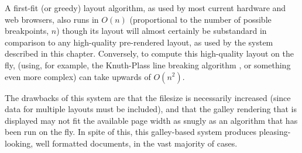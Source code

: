 A first-fit (or greedy) layout algorithm, as used by most current \ebook{} hardware and web browsers, also runs in $O(n)$ (proportional to the number of possible breakpoints, $n$) though its layout will almost certainly be substandard in comparison to any high-quality pre-rendered layout, as used by the system described in this chapter. Conversely, to compute this high-quality layout on the fly, (using, for example, the Knuth-Plass line breaking algorithm \cite{Knuth1981}, or something even more complex) can take upwards of $O(n^2)$.

The drawbacks of this system are that the filesize is necessarily increased (since data for multiple layouts must be included), and that the galley rendering that is displayed may not fit the available page width as snugly as an algorithm that has been run on the fly. In spite of this, this galley-based system produces pleasing-looking, well formatted documents, in the vast majority of cases.





